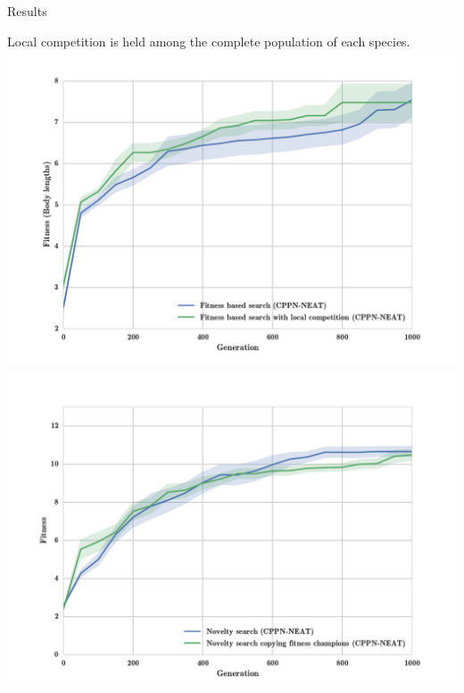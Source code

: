 \documentclass{beamer}
\begin{document}
\begin{frame}[allowframebreaks]{Results}
\begin{minipage}{\textwidth}
\begin{block}{Local competition is held among the complete population of each species.}
\includegraphics[width=1.0\textwidth]{figures/results/fitComp100percent.pdf}
\end{block}
\end{minipage}

\begin{minipage}{\textwidth}
\begin{block}{}
\includegraphics[width=1.0\textwidth]{figures/results/CopyFitChampions5.pdf}
\end{block}
\end{minipage}


\end{frame}
\end{document}
